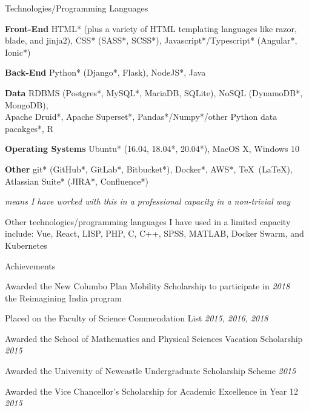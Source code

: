 \documentclass{resume} %
\begin{document}
\begin{rSection}{Technologies/Programming Languages}
    \item {\bf Front-End} HTML* (plus a variety of HTML templating languages like razor, blade, and jinja2), CSS* (SASS*, SCSS*), Javascript*/Typescript* (Angular*, Ionic*)
    \item {\bf Back-End} Python* (Django*, Flask), NodeJS*, Java
    \item {\bf Data} RDBMS (Postgres*, MySQL*, MariaDB, SQLite), NoSQL (DynamoDB*, MongoDB), \\ Apache Druid*, Apache Superset*, Pandas*/Numpy*/other Python data pacakges*, R
    \item {\bf Operating Systems} Ubuntu* (16.04, 18.04*, 20.04*), MacOS X, Windows 10
    \item {\bf Other} git* (GitHub*, GitLab*, Bitbucket*), Docker*, AWS*, \TeX\ (\LaTeX), Atlassian Suite* (JIRA*, Confluence*)
    \item {\em * means I have worked with this in a professional capacity in a non-trivial way}
    \item Other technologies/programming languages I have used in a limited capacity include: Vue, React, LISP, PHP, C, C++, SPSS, MATLAB, Docker Swarm, and Kubernetes
\end{rSection}

\begin{rSection}{Achievements}
    \item Awarded the New Columbo Plan Mobility Scholarship to participate in \hfill {\em 2018} \\ the Reimagining India program
    \item Placed on the Faculty of Science Commendation List \hfill {\em 2015, 2016, 2018}
    \item Awarded the School of Mathematics and Physical Sciences Vacation Scholarship \hfill {\em 2015}
    \item Awarded the University of Newcastle Undergraduate Scholarship Scheme \hfill {\em 2015} \
    \item Awarded the Vice Chancellor's Scholarship for Academic Excellence in Year 12 \hfill {\em 2015}
\end{rSection}
\end{document}
